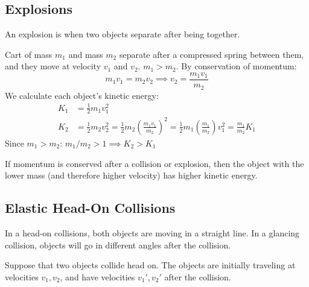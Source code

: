 \documentclass{article}
\newcommand{\definition}[1]{\begin{tcolorbox}[colback=red!5!white,colframe=red!75!black,parbox=false] #1 \end{tcolorbox}}
\newcommand{\theorem}[2]{\begin{tcolorbox}[title={#1},colback=blue!5!white,colframe=blue!75!black,parbox=false] #2 \end{tcolorbox}}
\begin{document}
\subsection{Explosions}

\definition{An explosion is when two objects separate after being together.}

Cart of mass $m_1$ and mass $m_2$ separate after a compressed spring between them, and they move at velocity $v_1$ and $v_2$. $m_1>m_2$. By conservation of momentum:
\begin{equation*}
    m_1v_1=m_2v_2
	\implies v_2=\frac{m_1v_1}{m_2}
\end{equation*}
We calculate each object's kinetic energy:
\begin{align*}
	K_1&=\frac12m_1v_1^2 \\
	K_2&=\frac12m_2v_2^2
	   =\frac12m_2 \left( \frac{m_1v_1}{m_2} \right)^2
	   =\frac12 m_1\left(\frac{m_1}{m_2}\right)v_1^2
	   =\frac{m_1}{m_2}K_1
\end{align*}
Since $m_1>m_2$: $m_1/m_2>1\implies K_2>K_1$

\theorem*{If momentum is conserved after a collision or explosion, then the object with the lower mass (and therefore higher velocity) has higher kinetic energy.}

\subsection{Elastic Head-On Collisions}

\definition{In a head-on collisions, both objects are moving in a straight line. In a glancing collision, objects will go in different angles after the collision.}

Suppose that two objects collide head on. The objects are initially traveling at velocities $v_1,v_2$, and have velocities $v_1',v_2'$ after the collision.
\end{document}
